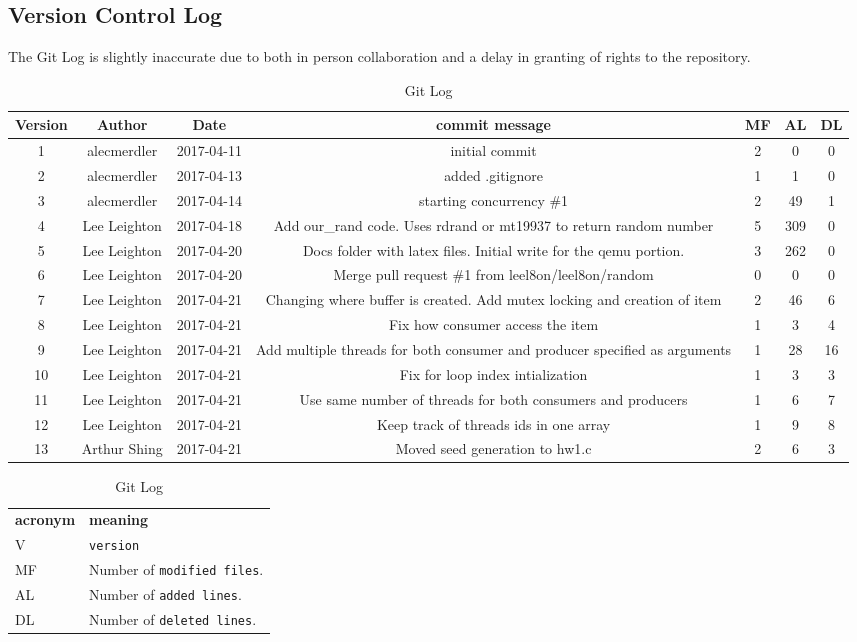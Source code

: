 \documentclass[journal, letterpaper, draftclsnofoot, onecolumn, 10pt]{IEEEtran}
\begin{document}
\subsection{Version Control Log}
The Git Log is slightly inaccurate due to both in person collaboration and a delay in granting of rights to the repository.
\FloatBarrier
\begin{table}[h!]
\centering
\caption{Git Log}
\begin{tabular}{|c|c|c|c|c|c|c|}
    \hline \textbf{Version} & \textbf{Author} & \textbf{Date} & \textbf{commit message} & \textbf{MF} & \textbf{AL} & \textbf{DL}  \\
    \hline 1 & alecmerdler & 2017-04-11 & initial commit & 2 & 0 & 0 \\
    \hline 2 & alecmerdler & 2017-04-13 & added .gitignore & 1 & 1 & 0 \\
    \hline 3 & alecmerdler & 2017-04-14 & starting concurrency \#1 & 2 & 49 & 1 \\
    \hline 4 & Lee Leighton & 2017-04-18 & Add our\_rand code. Uses rdrand or mt19937 to return random number & 5 & 309 & 0 \\
    \hline 5 & Lee Leighton & 2017-04-20 & Docs folder with latex files. Initial write for the qemu portion. & 3 & 262 & 0 \\
    \hline 6 & Lee Leighton & 2017-04-20 & Merge pull request \#1 from leel8on/leel8on/random & 0 & 0 & 0 \\
    \hline 7 & Lee Leighton & 2017-04-21 & Changing where buffer is created. Add mutex locking and creation of item & 2 & 46 & 6 \\
    \hline 8 & Lee Leighton & 2017-04-21 & Fix how consumer access the item & 1 & 3 & 4 \\
    \hline 9 & Lee Leighton & 2017-04-21 & Add multiple threads for both consumer and producer specified as arguments & 1 & 28 & 16 \\
    \hline 10 & Lee Leighton & 2017-04-21 & Fix for loop index intialization & 1 & 3 & 3 \\
    \hline 11 & Lee Leighton & 2017-04-21 & Use same number of threads for both consumers and producers & 1 & 6 & 7 \\
    \hline 12 & Lee Leighton & 2017-04-21 & Keep track of threads ids in one array & 1 & 9 & 8 \\
    \hline 13 & Arthur Shing & 2017-04-21 & Moved seed generation to hw1.c & 2 & 6 & 3 \\
    \hline
\end{tabular}
\begin{tabular}{lp{12cm}}
  \label{tabular:legend:git-log}
  \textbf{acronym} & \textbf{meaning} \\
  V & \texttt{version} \\
  MF & Number of \texttt{modified files}. \\
  AL & Number of \texttt{added lines}. \\
  DL & Number of \texttt{deleted lines}. \\
\end{tabular}
\end{table}
\FloatBarrier
\end{document}
